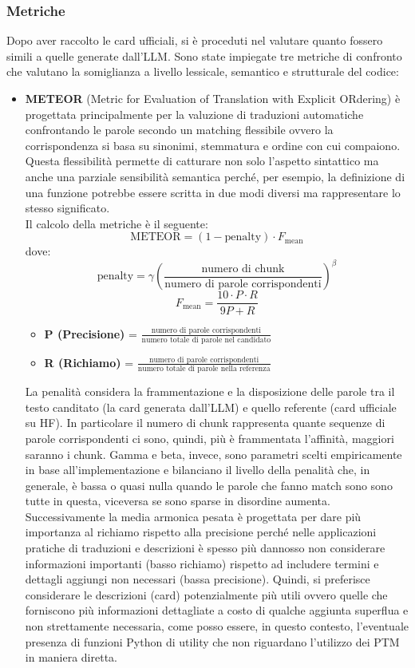 \documentclass{article}
\begin{document}
\subsubsection{Metriche}
Dopo aver raccolto le card ufficiali, si è proceduti nel valutare quanto fossero simili a quelle generate dall'LLM. Sono state impiegate tre metriche di confronto che valutano la somiglianza a livello lessicale, semantico e strutturale del codice:
\begin{itemize}
    \item \textbf{METEOR} (Metric for Evaluation of Translation with Explicit ORdering) è progettata principalmente per la valuzione di traduzioni automatiche confrontando le parole secondo un matching flessibile ovvero la corrispondenza si basa su sinonimi, stemmatura e ordine con cui compaiono. Questa flessibilità permette di catturare non solo l'aspetto sintattico ma anche una parziale sensibilità semantica perché, per esempio, la definizione di una funzione potrebbe essere scritta in due modi diversi ma rappresentare lo stesso significato.\\
    Il calcolo della metriche è il seguente:
    \[
    \text{METEOR} = (1 - \text{penalty}) \cdot F_{\text{mean}}
    \]
    dove:
    \[
        \text{penalty} = \gamma \left( \frac{\text{numero di chunk}}{\text{numero di parole corrispondenti}} \right)^\beta
    \]
    \[
        F_{\text{mean}} = \frac{10 \cdot P \cdot R}{9P + R}
    \]
    \begin{itemize}
        \item \textbf{P (Precisione)} = $\frac{\text{numero di parole corrispondenti}}{\text{numero totale di parole nel candidato}}$
        \item \textbf{R (Richiamo)} = $\frac{\text{numero di parole corrispondenti}}{\text{numero totale di parole nella referenza}}$
    \end{itemize}
    La penalità considera la frammentazione e la disposizione delle parole tra il testo canditato (la card generata dall'LLM) e quello referente (card ufficiale su HF). In particolare il numero di chunk rappresenta quante sequenze di parole corrispondenti ci sono, quindi, più è frammentata l'affinità, maggiori saranno i chunk. Gamma e beta, invece, sono parametri scelti empiricamente in base all'implementazione e bilanciano il livello della penalità che, in generale, è bassa o quasi nulla quando le parole che fanno match sono sono tutte in questa, viceversa se sono sparse in disordine aumenta.\\
    Successivamente la media armonica pesata è progettata per dare più importanza al richiamo rispetto alla precisione perché nelle applicazioni pratiche di traduzioni e descrizioni è spesso più dannosso non considerare informazioni importanti (basso richiamo) rispetto ad includere termini e dettagli aggiungi non necessari (bassa precisione). Quindi, si preferisce considerare le descrizioni (card) potenzialmente più utili ovvero quelle che forniscono più informazioni dettagliate a costo di qualche aggiunta superflua e non strettamente necessaria, come posso essere, in questo contesto, l'eventuale presenza di funzioni Python di utility che non riguardano l'utilizzo dei PTM in maniera diretta.\\

\end{itemize}
\end{document}
